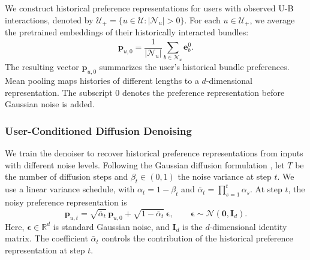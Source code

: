 \documentclass[letterpaper,journal]{IEEEtran}
\begin{document}
We construct historical preference representations for users with observed U-B interactions, denoted by $\mathcal U_+=\{u\in\mathcal U:|\mathcal N_u|>0\}$. For each $u\in\mathcal U_+$, we average the pretrained embeddings of their historically interacted bundles:
\begin{equation}
\mathbf p_{u,0}
=\frac{1}{|\mathcal N_u|}
\sum_{b\in\mathcal N_u}\mathbf e_b^0.
\tag{3}
\end{equation}
The resulting vector $\mathbf p_{u,0}$ summarizes the user's historical bundle preferences. Mean pooling maps histories of different lengths to a $d$-dimensional representation. The subscript $0$ denotes the preference representation before Gaussian noise is added.

\subsubsection{User-Conditioned Diffusion Denoising}

We train the denoiser to recover historical preference representations from inputs with different noise levels. Following the Gaussian diffusion formulation \cite{ho2020ddpm,wang2023diffrec}, let $T$ be the number of diffusion steps and $\beta_t\in(0,1)$ the noise variance at step $t$. We use a linear variance schedule, with $\alpha_t=1-\beta_t$ and $\bar\alpha_t=\prod_{s=1}^{t}\alpha_s$. At step $t$, the noisy preference representation is
\begin{equation}
\mathbf p_{u,t}
=\sqrt{\bar\alpha_t}\,\mathbf p_{u,0}
+\sqrt{1-\bar\alpha_t}\,\boldsymbol\epsilon,
\qquad
\boldsymbol\epsilon\sim\mathcal N(\mathbf 0,\mathbf I_d).
\tag{4}
\end{equation}
Here, $\boldsymbol\epsilon\in\mathbb R^d$ is standard Gaussian noise, and $\mathbf I_d$ is the $d$-dimensional identity matrix. The coefficient $\bar\alpha_t$ controls the contribution of the historical preference representation at step $t$.
\end{document}
